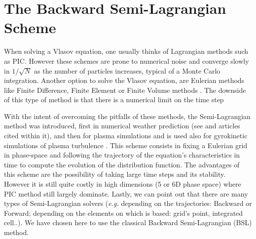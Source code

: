 \documentclass[proc]{edpsmath}
\begin{document}


\section{The Backward Semi-Lagrangian Scheme}
\label{sec:BSL_scheme}

When solving a Vlasov equation, one usually thinks of Lagrangian methods such as PIC\cite{Birdsall:1985:PPV:577251}. However  these schemes are prone to numerical noise and converge slowly in $1/\sqrt{N}$ as the number of particles increases, typical of a Monte Carlo integration. Another option to solve the Vlasov equation, are Eulerian methods like Finite Difference, Finite Element or Finite Volume methods
 \cite{filbet2003, Zaki1988184, banks2010}. The downside of this type of method is that there is a numerical limit on the time step

With the intent of overcoming  the pitfalls of these methods, the Semi-Lagrangian method was introduced, first in numerical weather prediction (see \cite{Kalnay03atmosphericmodeling} and articles cited within it), and then   for plasma simulations \cite{Sonnendrucker1999201, Cheng1976330} and is used also for gyrokinetic simulations of plasma turbulence \cite{grandgirard2006,kwon2015}.
This scheme consists in fixing a Eulerian grid in phase-space and following the trajectory of the equation's characteristics in time to compute the evolution of the distribution function. The advantages of this scheme are the possibility of taking large time steps and its stability. However it is still quite costly in  high dimensions (5 or 6D phase space) where PIC method still largely dominate.
 Lastly, we can point out that there are many types of Semi-Lagrangian solvers (\emph{e.g.} depending on the trajectories: Backward or Forward;  depending on the elements on which is based: grid's point, integrated cell..). We have chosen here to use the classical Backward Semi-Lagrangian (BSL) method. 
\end{document}
